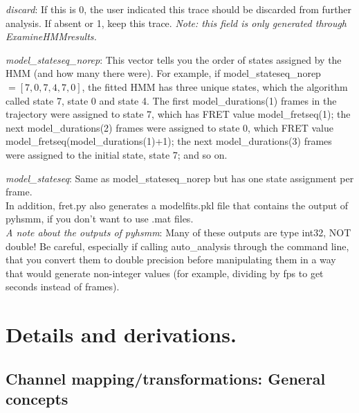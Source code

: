 \documentclass[11pt]{article}
\begin{document}
{\it discard}: If this is 0, the user indicated this trace should be discarded from further analysis. If absent or 1, keep this trace. {\it Note: this field is only generated through ExamineHMMresults.}

{\it model\_stateseq\_norep}: This vector tells you the order of states assigned by the HMM (and how many there were). For example, if model\_stateseq\_norep $=[7,0,7,4,7,0]$, the fitted HMM has three unique states, which the algorithm called state 7, state 0 and state 4. The first model\_durations(1) frames in the trajectory were assigned to state 7, which has FRET value model\_fretseq(1); the next model\_durations(2) frames were assigned to state 0, which FRET value model\_fretseq(model\_durations(1)+1); the next model\_durations(3) frames were assigned to the initial state, state 7; and so on. 

{\it model\_stateseq}: Same as model\_stateseq\_norep but has one state assignment per frame. \\

In addition, fret.py also generates a modelfits.pkl file that contains the output of pyhsmm, if you don't want to use .mat files.\\

{\it A note about the outputs of pyhsmm}: Many of these outputs are type int32, NOT double! Be careful, especially if calling auto\_analysis through the command line, that you convert them to double precision before manipulating them in a way that would generate non-integer values (for example, dividing by fps to get seconds instead of frames).

\newpage

%
%
%

\section{Details and derivations.}\label{sec:Details}

\subsection{Channel mapping/transformations: General concepts}\label{sec:TransformGeneral}
\end{document}
